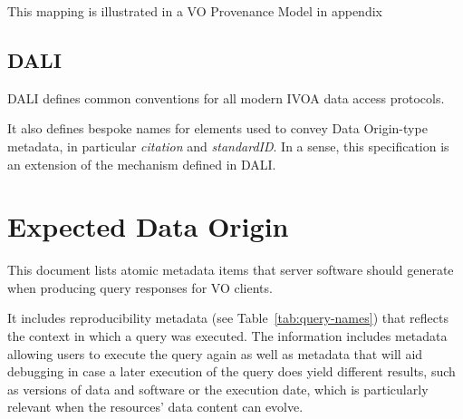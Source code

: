 \documentclass[11pt,a4paper]{ivoa}
\begin{document}
This mapping is illustrated in a VO Provenance Model \citep{2020ivoa.spec.0411S} in  appendix 





\subsection{DALI}
DALI \citep{2017ivoa.spec.0517D} defines common conventions for all
modern IVOA data access protocols.

It also defines bespoke names for  elements used to convey
Data Origin-type metadata, in particular \emph{citation} and \emph{standardID}.  In a sense,
this specification is an extension of the mechanism defined in DALI.

\section{Expected Data Origin}
This document lists atomic metadata items that server software should
generate when producing query responses for VO clients.

It includes reproducibility metadata (see Table~\ref{tab:query-names})
that reflects the context in which a query was executed. The information
includes metadata allowing users to execute the query again as well as
metadata that will aid debugging in case a later execution of the
query does yield different results, such as versions of data and software
or the execution
date, which is particularly relevant when the resources' data content
can evolve.
\end{document}
